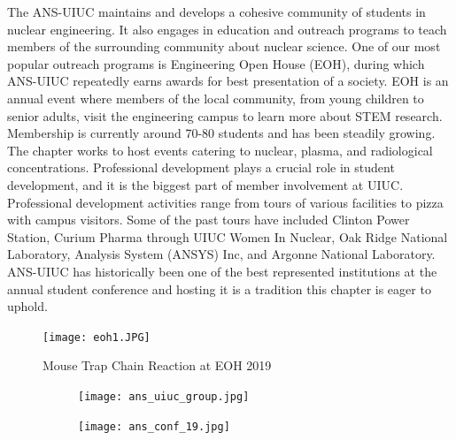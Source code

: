 The ANS-UIUC maintains and develops a cohesive community of students in nuclear 
engineering. It also engages in education and outreach programs to teach 
members of the surrounding community about nuclear science. One of our most 
popular outreach programs is Engineering Open House (EOH), during which 
ANS-UIUC repeatedly earns awards for best presentation of a society. EOH is an 
annual event where members of the local community, from young children to 
senior adults, visit the engineering campus to learn more about STEM research. 
Membership is currently around 70-80 students and has been steadily growing. 
The chapter works to host events catering to nuclear, plasma, and radiological 
concentrations. Professional development plays a crucial role in student 
development, and it is the biggest part of member involvement at UIUC. 
Professional development activities range from tours of various facilities to 
pizza with campus visitors. Some of the past tours have included Clinton Power 
Station, Curium Pharma through UIUC Women In Nuclear, Oak Ridge National 
Laboratory, Analysis System (ANSYS) Inc, and Argonne National Laboratory. 
ANS-UIUC has historically been one of the best represented institutions at the 
annual student conference and hosting it is a tradition this chapter is eager 
to uphold. 


\begin{figure}[H]
  \centering
  \texttt{[image: eoh1.JPG]}
  \caption{Mouse Trap Chain Reaction at EOH 2019}
\end{figure}

\begin{figure}[H]
  \centering
  \begin{subfigure}{0.5\textwidth}
    \centering
    \texttt{[image: ans\_uiuc\_group.jpg]}
  \end{subfigure}%
  \begin{subfigure}{0.5\textwidth}
    \centering
    \texttt{[image: ans\_conf\_19.jpg]}
  \end{subfigure}   
\end{figure} 



